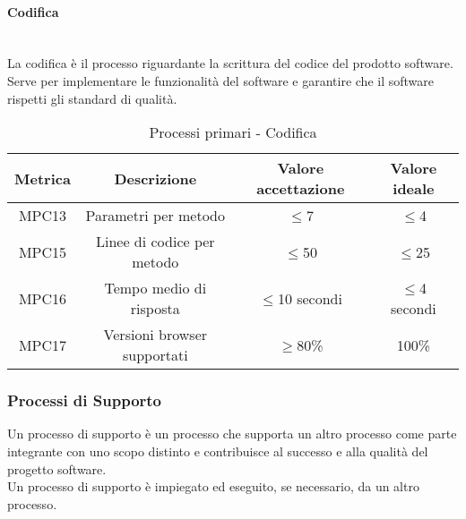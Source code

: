 \documentclass[11pt]{article}
\begin{document}
\begin{justify}
\paragraph{Codifica}\mbox{}\\
La codifica è il processo riguardante la scrittura del codice del prodotto software.\\
Serve per implementare le funzionalità del software e garantire che il software rispetti gli standard di qualità.\\
\begin{table}[H]
  \centering
\begin{tabular}{|c|c|c|c|}
  \hline
  \textbf{Metrica} & \textbf{Descrizione} & \textbf{Valore accettazione} & \textbf{Valore ideale}\\
  \hline
  MPC13 & Parametri per metodo & $\leq$7 & $\leq$4 \\
  \hline
  MPC15 & Linee di codice per metodo & $\leq$50 & $\leq$25 \\
  \hline
  MPC16 & Tempo medio di risposta & $\leq$10 secondi & $\leq$4 secondi \\
  \hline
  MPC17 & Versioni browser supportati & $\geq$80\% & 100\% \\
  \hline
\end{tabular}
\caption{Processi primari - Codifica}
\label{tab:codifica}
\end{table}


\subsubsection{Processi di Supporto}
Un processo di supporto è un processo che supporta un altro processo come parte integrante con uno scopo distinto e contribuisce al successo e alla qualità del progetto software.\\
Un processo di supporto è impiegato ed eseguito, se necessario, da un altro processo.\\

\end{justify}
\end{document}
